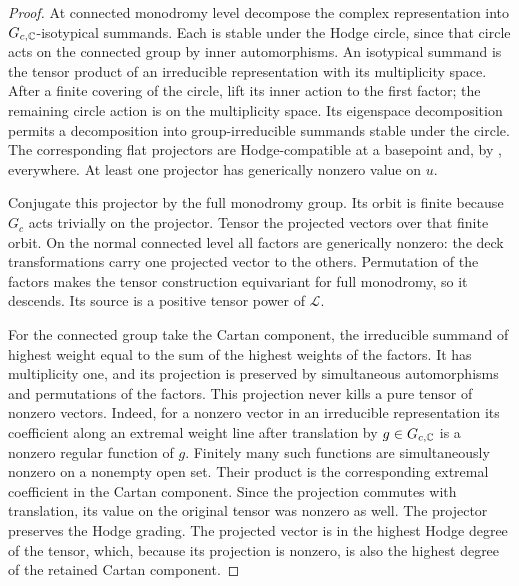 \begin{proof}
At connected monodromy level decompose the complex representation
into $G_{c,\mathbb C}$-isotypical summands.  Each is stable under the Hodge
circle, since that circle acts on the connected group by inner
automorphisms.  An isotypical summand is the tensor product of an
irreducible representation with its multiplicity space.  After a
finite covering of the circle, lift its inner action to the first
factor; the remaining circle action is on the multiplicity space.
Its eigenspace decomposition permits a decomposition into
group-irreducible summands stable under the circle.  The corresponding
flat projectors are Hodge-compatible at a basepoint and, by
, everywhere.  At least one projector
has generically nonzero value on $u$.

Conjugate this projector by the full monodromy group.  Its orbit is
finite because $G_c$ acts trivially on the projector.  Tensor the
projected vectors over that finite orbit.  On the normal connected
level all factors are generically nonzero: the deck transformations
carry one projected vector to the others.  Permutation of the
factors makes the tensor construction equivariant for full
monodromy, so it descends.  Its source is a positive tensor power
of $\mathcal L$.

For the connected group take the Cartan component, the irreducible
summand of highest weight equal to the sum of the highest weights
of the factors.  It has multiplicity one, and its projection is
preserved by simultaneous automorphisms and permutations of the
factors.  This projection never kills a pure tensor of nonzero
vectors.  Indeed, for a nonzero vector in an irreducible
representation its coefficient along an extremal weight line
after translation by $g\in G_{c,\mathbb C}$ is a nonzero regular function
of $g$.  Finitely many such functions are simultaneously nonzero
on a nonempty open set.  Their product is the corresponding
extremal coefficient in the Cartan component.  Since the
projection commutes with translation, its value on the original
tensor was nonzero as well.  The projector preserves the Hodge
grading.  The projected vector is in the highest Hodge degree of
the tensor, which, because its projection is nonzero, is also the
highest degree of the retained Cartan component.


\end{proof}
